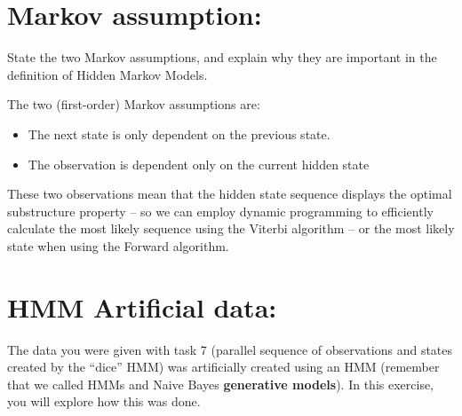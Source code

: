 \documentclass[10pt,\jkfside,a4paper]{article}
\begin{document}
\section*{Markov assumption:}

State the two Markov assumptions, and explain why they are important in the
definition of Hidden Markov Models.

The two (first-order) Markov assumptions are:

\begin{itemize}

\item The next state is only dependent on the previous state.

\item The observation is dependent only on the current hidden state

\end{itemize}

These two observations mean that the hidden state sequence displays the 
optimal substructure 
property -- so we can employ dynamic programming to efficiently calculate the 
most likely sequence using the Viterbi algorithm -- or the most likely state 
when using the Forward algorithm.

\section*{HMM Artificial data:}

The data you were given with task 7 (parallel sequence of observations and states
created by the “dice” HMM) was artificially created using an HMM (remember
that we called HMMs and Naive Bayes \textbf{generative models}). In this exercise,
you will explore how this was done.
\end{document}
